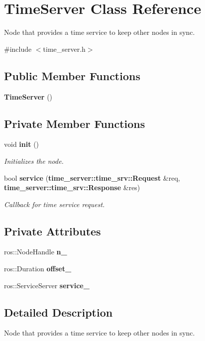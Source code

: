 \section{\-Time\-Server \-Class \-Reference}
\label{classTimeServer}


\-Node that provides a time service to keep other nodes in sync.  




{\ttfamily \#include $<$time\-\_\-server.\-h$>$}

\subsection*{\-Public \-Member \-Functions}
\begin{DoxyCompactItemize}
\item 
{\bf \-Time\-Server} ()
\end{DoxyCompactItemize}
\subsection*{\-Private \-Member \-Functions}
\begin{DoxyCompactItemize}
\item 
void {\bf init} ()
\begin{DoxyCompactList}\small\item\em \-Initializes the node. \end{DoxyCompactList}\item 
bool {\bf service} ({\bf time\-\_\-server\-::time\-\_\-srv\-::\-Request} \&req, {\bf time\-\_\-server\-::time\-\_\-srv\-::\-Response} \&res)
\begin{DoxyCompactList}\small\item\em \-Callback for time service request. \end{DoxyCompactList}\end{DoxyCompactItemize}
\subsection*{\-Private \-Attributes}
\begin{DoxyCompactItemize}
\item 
ros\-::\-Node\-Handle {\bf n\-\_\-}
\item 
ros\-::\-Duration {\bf offset\-\_\-}
\item 
ros\-::\-Service\-Server {\bf service\-\_\-}
\end{DoxyCompactItemize}


\subsection{\-Detailed \-Description}
\-Node that provides a time service to keep other nodes in sync. 

